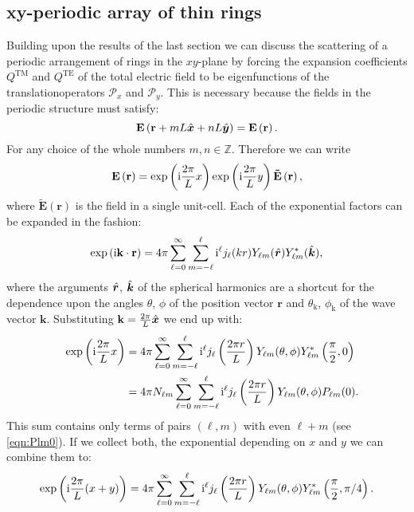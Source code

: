 \subsection{xy-periodic array of thin rings}
Building upon the results of the last section we can discuss the scattering of a periodic arrangement of rings in the $xy$-plane by forcing the expansion coefficients $Q^\text{TM}$ and $Q^\text{TE}$ of the total electric field to be eigenfunctions of the translationoperators $\mathcal{P}_x$ and $\mathcal{P}_y$. This is necessary because the fields in the periodic structure must satisfy:
\begin{equation}
\mathbf{E}\left(\mathbf{r}+m L \hat{\bm{x}}+
n L \hat{\bm{y}}\right)=
\mathbf{E}\left(\mathbf{r}\right).
\end{equation}
For any choice of the whole numbers $m, n\in \mathbb{Z}$. Therefore we can write
\begin{equation}
\mathbf{E}\left(\mathbf{r}\right) = 
\exp\left(\mathrm{i} \frac{2\pi}{L}x\right) \exp\left(\mathrm{i} \frac{2\pi}{L}y\right)\mathbf{\tilde{E}}\left(\mathbf{r}\right),
\end{equation}
where $\mathbf{\tilde{E}}(\mathbf{r})$ is the field in a single unit-cell. Each of the exponential factors can be expanded in the fashion:
\begin{equation}
\exp\left(\mathrm{i}\mathbf{k}\cdot \mathbf{r}\right) = 4\pi \sum_{\ell=0}^\infty \sum_{m=-\ell}^\ell
\mathrm{i}^\ell j_\ell(kr) Y_{\ell m}(\hat{\bm{r}}) Y_{\ell m}^*(\hat{\bm{k}}),
\end{equation}
where the arguments $\hat{\bm{r}}$, $\hat{\bm{k}}$ of the spherical harmonics are a shortcut for the dependence upon the angles $\theta$, $\phi$ of the position vector $\mathbf{r}$ and $\theta_\mathrm{k}$, $\phi_\mathrm{k}$ of the wave vector $\mathbf{k}$. Substituting $\mathbf{k}=\frac{2\pi}{L}\hat{\bm{x}}$ we end up with:
\begin{align}
&& \nonumber
\exp\left(\mathrm{i} \frac{2\pi}{L} x\right) &= 4\pi \sum_{\ell=0}^\infty \sum_{m=-\ell}^\ell
\mathrm{i}^\ell j_\ell\left(\frac{2\pi r}{L}\right) Y_{\ell m}(\theta, \phi) Y_{\ell m}^*\left(\frac{\pi}{2}, 0\right) \\
&& &= 4\pi N_{\ell m} \sum_{\ell=0}^\infty \sum_{m=-\ell}^\ell
\mathrm{i}^\ell j_\ell\left(\frac{2\pi r}{L}\right) Y_{\ell m}(\theta, \phi)
P_{\ell m}(0).
\label{eqn:xperiodicity}
\end{align}
This sum contains only terms of pairs $(\ell,m)$ with even $\ell+m$ (see \cref{eqn:Plm0}). If we collect both, the exponential depending on $x$ and $y$ we can combine them to:
\begin{equation}
\exp\left(\mathrm{i} \frac{2\pi}{L} (x+y)\right) = 4\pi \sum_{\ell=0}^\infty \sum_{m=-\ell}^\ell
\mathrm{i}^\ell j_\ell\left(\frac{2\pi r}{L}\right) Y_{\ell m}(\theta, \phi) Y_{\ell m}^*\left(\frac{\pi}{2}, \pi/4\right).
\end{equation}

